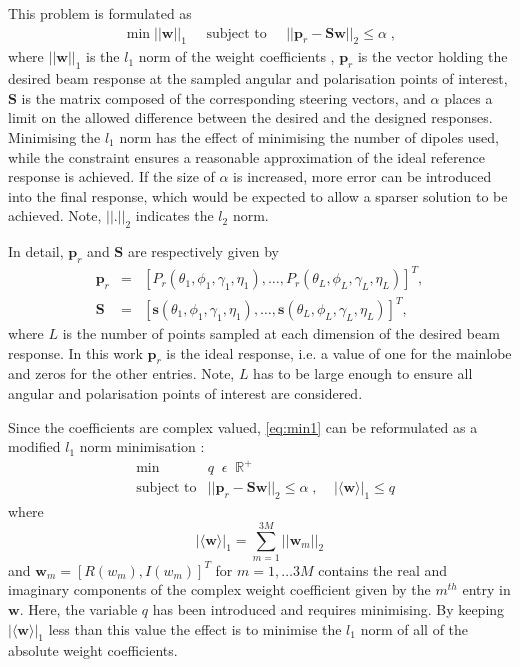 \documentclass[10pt,final]{IEEEtran}
\begin{document}
This problem is formulated as
\begin{eqnarray}\label{eq:min1}
    \min||\textbf{w}||_{1}\;\;\;\;\; \text{subject to}\;\;\;\;\;
    ||\textbf{p}_r-\textbf{S}\textbf{w}||_{2}\leq\alpha\;,
\end{eqnarray}
where $||\textbf{w}||_{1}$ is the $l_{1}$ norm of the weight coefficients \cite{Candes06}, $\textbf{p}_r$ is the vector holding
the desired beam response at the sampled angular and polarisation
points of interest, $\textbf{S}$ is the matrix composed of the
corresponding steering vectors, and $\alpha$ places a limit on the
allowed difference between the desired and the designed responses.  Minimising the $l_{1}$ norm has the effect of minimising the number of dipoles used, while the constraint ensures a reasonable approximation of the ideal reference response is achieved.  If the size of $\alpha$ is increased, more error can be introduced into the final response, which would be expected to allow a sparser solution to be achieved.  Note, $||.||_{2}$ indicates the $l_{2}$ norm.

In detail, $\textbf{p}_r$ and $\textbf{S}$ are respectively
given by
\begin{eqnarray}
\label{eq:pr}
    \textbf{p}_r&=&[P_r(\theta_{1},\phi_{1},\gamma_{1},\eta_{1}), \ldots, P_r(\theta_{L},\phi_{L},\gamma_{L},\eta_{L})]^{T},\\
\label{eq:S}
    \textbf{S}&=&[\textbf{s}(\theta_{1},\phi_{1},\gamma_{1},\eta_{1}),
    \ldots,
    \textbf{s}(\theta_{L},\phi_{L},\gamma_{L},\eta_{L})]^{T},
\end{eqnarray}
where $L$ is the number of points sampled at each dimension of the
desired beam response.  In this work $\textbf{p}_{r}$ is the ideal
response, i.e. a value of one for the mainlobe and zeros for the
other entries.  Note, $L$ has to be large enough to ensure all angular and polarisation points of interest are considered.

Since the coefficients are complex valued, \eqref{eq:min1} can be reformulated as a modified $l_{1}$ norm minimisation \cite{Winter05}:
\begin{eqnarray}\label{eq:mint}\nonumber
&\min& q \;\; \epsilon\;\; \mathbb{R}^{+}\\ &\text{subject to}&
    ||\textbf{p}_{r}-\textbf{S}\textbf{w}||_{2}\leq\alpha\;, \;\;\;\;|\langle\textbf{w}\rangle|_{1}\leq q
\end{eqnarray}
where
\begin{equation}\label{eq:constraint2}
    |\langle\textbf{w}\rangle|_{1}=\sum_{m=1}^{3M}||\textbf{w}_{m}||_{2}
\end{equation}
and $\textbf{w}_{m}=[R(w_{m}),I(w_{m})]^{T}$ for $m=1, \ldots 3M$ contains the real and imaginary components of the complex weight coefficient given by the $m^{th}$ entry in $\textbf{w}$.  Here, the variable $q$ has been introduced and requires minimising.  By keeping $|\langle\textbf{w}\rangle|_{1}$ less than this value the effect is to minimise the $l_{1}$ norm of all of the absolute weight coefficients.
\end{document}
